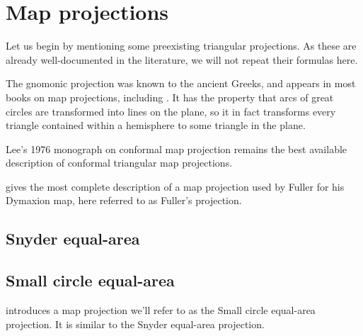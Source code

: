 \documentclass{amsart}[12pt]
\begin{document}
\section{Map projections}

Let us begin by mentioning some preexisting triangular projections. As these are already well-documented in the literature, we will not repeat their formulas here.

The gnomonic projection was known to the ancient Greeks, and appears in most books on map projections, including \cite{snyder87}. It has the property that arcs of great circles are transformed into lines on the plane, so it in fact transforms every triangle contained within a hemisphere to some triangle in the plane.

Lee's 1976 monograph on conformal map projection \cite{lee1976conformal} remains the best available description of conformal triangular map projections.

\cite{crider08} gives the most complete description of a map projection used by Fuller for his Dymaxion map, here referred to as Fuller's projection.

\subsection{Snyder equal-area}
\cite{snyder92}\cite{leeuwen2006}

\cite{lambers}\cite{patt}

\subsection{Small circle equal-area}
\cite{leeuwen2006} introduces a map projection we'll refer to as the Small circle equal-area projection. It is similar to the Snyder equal-area projection.
\end{document}

